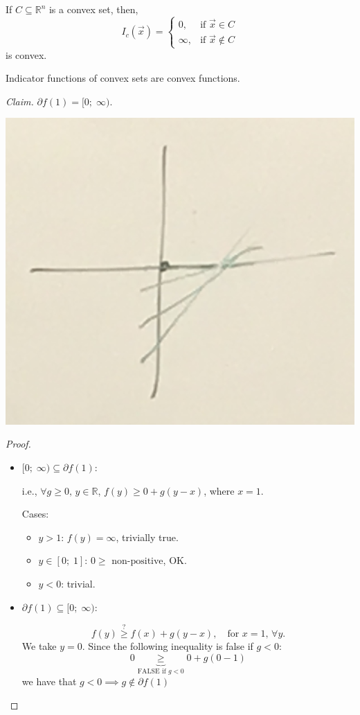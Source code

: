 \documentclass{article}
\newcommand{\R}{\mathbb{R}}             %
\newcommand{\x}{\vec{x}}
\begin{document}
If $C \subseteq \R^n$ is a convex set, then,
\[
    I_c(\x) = \begin{cases}
        0, & \text{if } \x \in C \\
        \infty, & \text{if } \x \notin C
    \end{cases}
\]
is convex.

Indicator functions of convex sets are convex functions.

\textit{Claim.} $\partial f(1) = [0;\; \infty)$.

\begin{center}
    \includegraphics[scale=0.2]{indicator.JPG}
\end{center}

\begin{proof}
    \begin{itemize}
        \item $[0;\; \infty) \subseteq \partial f(1)$:

        i.e., $\forall g \geq 0,\, y \in \R$, $f(y) \geq 0 + g(y - x)$, where $x = 1$.

        Cases:
        \begin{itemize}
            \item $y > 1$: $f(y) = \infty$, trivially true.
            \item $y \in [0;\; 1]$: $0 \geq \text{ non-positive}$, OK.
            \item $y < 0$: trivial.
        \end{itemize}

        \item $\partial f(1) \subseteq [0;\; \infty)$:

        \[
            f(y) \overset{\text{?}}{\geq} f(x) + g(y - x), \quad \text{for } x = 1,\, \forall y.
        \]
        We take $y = 0$. Since the following inequality is false if $g < 0$:
        \[
            0 \underbrace{\geq}_{\text{FALSE if } g < 0} 0 + g(0 - 1)
        \]
        we have that $g < 0 \implies g \notin \partial f(1)$
    \end{itemize}
\end{proof}
\end{document}
